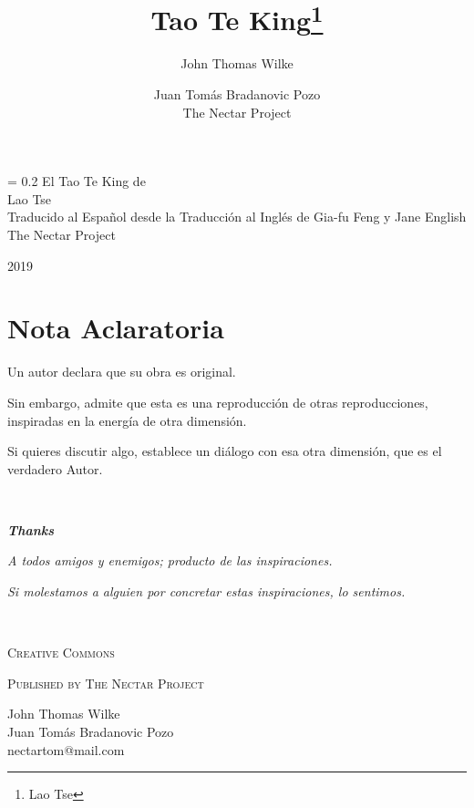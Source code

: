 \documentclass[hidelinks]{memoir}
\newcommand*{\FSfont}[1]{%
	\fontencoding{T1}\fontfamily{#1}\selectfont}
\newlength{\tpheight}\setlength{\tpheight}{0.9\textheight}
\newlength{\txtheight}\setlength{\txtheight}{0.9\tpheight}
\newlength{\drop}
\begin{document}
	\title{Tao Te King\thanks{Lao Tse}}
	\author{
		John Thomas Wilke	\and
		Juan Tomás Bradanovic Pozo\\
		The Nectar Project}

\begin{titlingpage}

\begingroup%
\drop = 0.2\txtheight
\centering
\vfill
{\Huge El Tao Te King de}\\[\baselineskip]
{\Huge Lao Tse}\\[\baselineskip]
{\large Traducido al Español desde la Traducción al Inglés de Gia-fu Feng y Jane English}\\[0.5\drop]

{\Large The Nectar Project}\par
{\large\scshape 2019}\par
\vfill\null
\endgroup

\end{titlingpage}
	
\frontmatter


	
	\chapter*{Nota Aclaratoria}
	
	Un autor declara que su obra es original.
	
	Sin embargo, admite que esta es una reproducción de otras
	reproducciones, inspiradas en la energía de otra dimensión.
	
	Si quieres discutir algo, establece un diálogo con esa otra dimensión,
	que es el verdadero Autor.
	

	\cleardoublepage
	~\vfill

		
		\textit{\textbf{Thanks}}

		\textit{A todos amigos y enemigos; producto de las inspiraciones.}
		
		\textit{Si molestamos a alguien por concretar estas inspiraciones, lo sentimos.}
	
	\newpage
		~\vfill
		\thispagestyle{empty}
		\setlength{\parindent}{0pt}
		\setlength{\parskip}{\baselineskip}
		
			\ccLogo \space \textsc{Creative Commons}
		
		\par\textsc{Published by The Nectar Project}
		
		\par John Thomas Wilke	\\
		Juan Tomás Bradanovic Pozo	\\
		nectartom@mail.com
		
\end{document}
